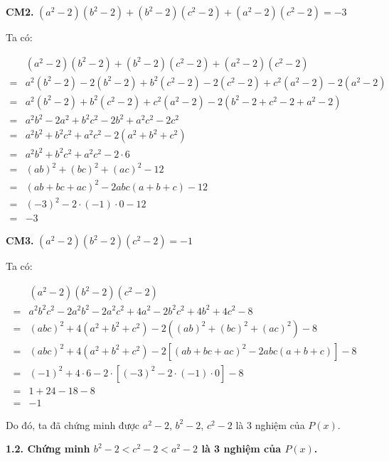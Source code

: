 \textbf{CM2. } $(a^2 - 2)(b^2 - 2) + (b^2 -2)(c^2 - 2) + (a^2 -2)(c^2 - 2) = -3$

Ta có:

\begin{align*}
    &(a^2 - 2)(b^2 - 2) + (b^2 -2)(c^2 - 2) + (a^2 -2)(c^2 - 2)\\
    = &a^2(b^2-2) - 2(b^2 -2) + b^2(c^2-2) - 2(c^2-2) + c^2(a^2-2) - 2(a^2-2)\\
    = &a^2(b^2-2) + b^2(c^2-2) + c^2(a^2-2) -2(b^2-2 + c^2-2 + a^2-2)\\
    = &a^2b^2 -2a^2 + b^2c^2 - 2b^2 + a^2c^2 -2c^2\\
    = &a^2b^2 + b^2c^2 + a^2c^2 -2(a^2 + b^2 + c^2)\\
    = &a^2b^2 + b^2c^2 + a^2c^2 -2 \cdot 6\\
    = &(ab)^2 + (bc)^2 + (ac)^2 -12\\
    = &(ab + bc + ac)^2 - 2abc(a + b + c) - 12\\
    = &(-3)^2 - 2 \cdot (-1) \cdot 0 -12\\
    = &-3
\end{align*}

\textbf{CM3. }$(a^2 - 2)(b^2 - 2)(c^2 - 2) = -1$

Ta có:

\begin{align*}
    &(a^2 - 2)(b^2 - 2)(c^2 - 2)\\
    = &a^2b^2c^2 -2a^2b^2 - 2a^2c^2 + 4a^2 -2b^2c^2 + 4b^2 + 4c^2 - 8\\
    = &(abc)^2 + 4(a^2 + b^2 + c^2) - 2((ab)^2 + (bc)^2 + (ac)^2) - 8\\
    = &(abc)^2 + 4(a^2 + b^2 + c^2) - 2[(ab + bc + ac)^2 - 2abc(a + b + c)] - 8\\
    = &(-1)^2 + 4 \cdot 6 - 2 \cdot [(-3)^2 - 2 \cdot (-1) \cdot 0] - 8\\
    = &1 + 24 - 18 - 8\\
    = &-1
\end{align*}

Do đó, ta đã chứng minh được $a^2 - 2$, $b^2 - 2$, $c^2 -2$ là 3 nghiệm của $P(x)$.

\textbf{1.2. Chứng minh $b^2 - 2 < c^2 - 2 < a^2 - 2$ là 3 nghiệm của $P(x)$.}

